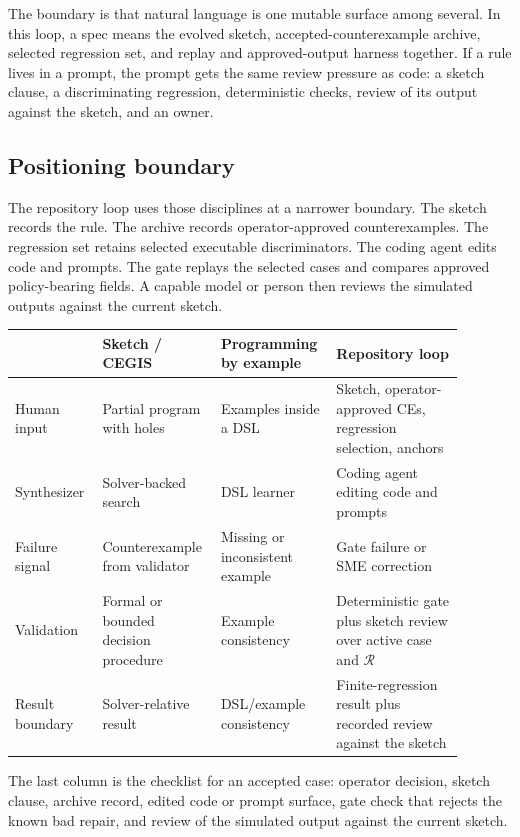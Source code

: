 \documentclass[11pt]{article}
\newcommand{\regression}{\mathcal{R}}
\begin{document}
The boundary is that natural language is one mutable surface among several.  In this loop, a spec
means the evolved sketch, accepted-counterexample archive, selected regression set, and replay
and approved-output harness together.  If a rule lives in a prompt, the prompt gets the same review
pressure as code: a sketch clause, a discriminating regression, deterministic checks, review of
its output against the sketch, and an owner.

\subsection{Positioning boundary}

The repository loop uses those disciplines at a narrower boundary.  The sketch records
the rule.  The archive records operator-approved counterexamples.  The regression set retains
selected executable discriminators.  The coding agent edits code and prompts.  The gate replays
the selected cases and compares approved policy-bearing fields.  A capable model or person then
reviews the simulated outputs against the current sketch.

\begin{center}
\scriptsize
\begin{tabular}{p{0.18\linewidth}p{0.22\linewidth}p{0.22\linewidth}p{0.27\linewidth}}
\toprule
 & Sketch / CEGIS & Programming by example & Repository loop \\
\midrule
Human input & Partial program with holes & Examples inside a DSL & Sketch, operator-approved CEs, regression selection, anchors \\
Synthesizer & Solver-backed search & DSL learner & Coding agent editing code and prompts \\
Failure signal & Counterexample from validator & Missing or inconsistent example & Gate failure or SME correction \\
Validation & Formal or bounded decision procedure & Example consistency & Deterministic gate plus sketch review over active case and $\regression$ \\
Result boundary & Solver-relative result & DSL/example consistency & Finite-regression result plus recorded review against the sketch \\
\bottomrule
\end{tabular}
\end{center}

The last column is the checklist for an accepted case: operator decision, sketch clause, archive
record, edited code or prompt surface, gate check that rejects the known bad repair, and review of
the simulated output against the current sketch.
\end{document}
